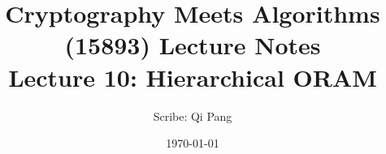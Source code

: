 \documentclass[11pt]{article}
\title{{\Large Cryptography Meets Algorithms (15893) Lecture Notes}\\[5pt]
{\bf Lecture 10: Hierarchical ORAM}}
\author{Scribe: Qi Pang}
\date{\today}
\theoremstyle{definition}
\begin{document}
\maketitle


{

}
%



\end{document}
